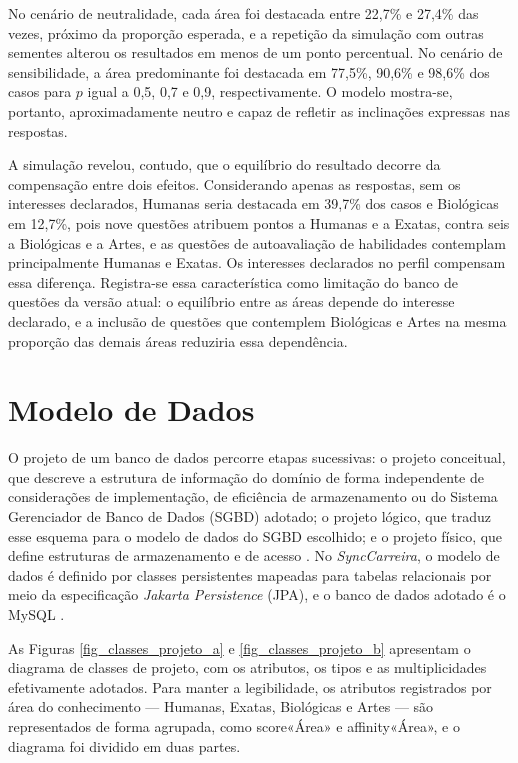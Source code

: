 No cenário de neutralidade, cada área foi destacada entre 22,7\% e 27,4\% das vezes, próximo da proporção esperada, e a repetição da simulação com outras sementes alterou os resultados em menos de um ponto percentual. No cenário de sensibilidade, a área predominante foi destacada em 77,5\%, 90,6\% e 98,6\% dos casos para $p$ igual a 0,5, 0,7 e 0,9, respectivamente. O modelo mostra-se, portanto, aproximadamente neutro e capaz de refletir as inclinações expressas nas respostas.

A simulação revelou, contudo, que o equilíbrio do resultado decorre da compensação entre dois efeitos. Considerando apenas as respostas, sem os interesses declarados, Humanas seria destacada em 39,7\% dos casos e Biológicas em 12,7\%, pois nove questões atribuem pontos a Humanas e a Exatas, contra seis a Biológicas e a Artes, e as questões de autoavaliação de habilidades contemplam principalmente Humanas e Exatas. Os interesses declarados no perfil compensam essa diferença. Registra-se essa característica como limitação do banco de questões da versão atual: o equilíbrio entre as áreas depende do interesse declarado, e a inclusão de questões que contemplem Biológicas e Artes na mesma proporção das demais áreas reduziria essa dependência.

\section{Modelo de Dados}

O projeto de um banco de dados percorre etapas sucessivas: o projeto conceitual, que descreve a estrutura de informação do domínio de forma independente de considerações de implementação, de eficiência de armazenamento ou do Sistema Gerenciador de Banco de Dados (SGBD) adotado; o projeto lógico, que traduz esse esquema para o modelo de dados do SGBD escolhido; e o projeto físico, que define estruturas de armazenamento e de acesso \cite{elmasri2011}. No \textit{SyncCarreira}, o modelo de dados é definido por classes persistentes mapeadas para tabelas relacionais por meio da especificação \textit{Jakarta Persistence} (JPA), e o banco de dados adotado é o MySQL \cite{mysql2026}.

As Figuras \ref{fig_classes_projeto_a} e \ref{fig_classes_projeto_b} apresentam o diagrama de classes de projeto, com os atributos, os tipos e as multiplicidades efetivamente adotados. Para manter a legibilidade, os atributos registrados por área do conhecimento — Humanas, Exatas, Biológicas e Artes — são representados de forma agrupada, como score«Área» e affinity«Área», e o diagrama foi dividido em duas partes.

